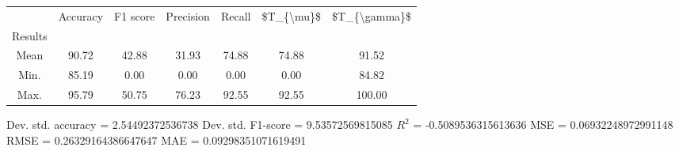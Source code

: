 \begin{tabular}{|c|c|c|c|c|c|c|}
\toprule
{} &  Accuracy &  F1 score &  Precision &  Recall &  \$T\_\{\textbackslash mu\}\$ &  \$T\_\{\textbackslash gamma\}\$ \\
Results &           &           &            &         &            &               \\
\hline
Mean    &     90.72 &     42.88 &      31.93 &   74.88 &      74.88 &         91.52 \\
Min.    &     85.19 &      0.00 &       0.00 &    0.00 &       0.00 &         84.82 \\
Max.    &     95.79 &     50.75 &      76.23 &   92.55 &      92.55 &        100.00 \\
\bottomrule
\end{tabular}

 Dev. std. accuracy = 2.54492372536738
 Dev. std. F1-score = 9.53572569815085
 $R^2$ = -0.5089536315613636
 MSE = 0.06932248972991148
 RMSE = 0.26329164386647647
 MAE = 0.09298351071619491